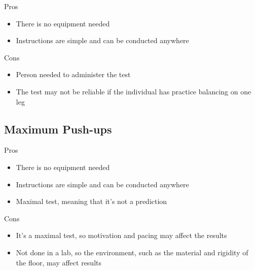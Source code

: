 \documentclass[12pt]{article}
\begin{document}
\begin{minipage}[t]{0.5\textwidth}
    \begin{center}Pros\end{center}
    \begin{itemize}
        \item There is no equipment needed
        \item Instructions are simple and can be conducted anywhere
    \end{itemize}
\end{minipage}
\begin{minipage}[t]{0.5\textwidth}
    \begin{center}Cons\end{center}
    \begin{itemize}
        \item Person needed to administer the test
        \item The test may not be reliable if the individual has practice balancing on one leg
    \end{itemize}
\end{minipage}

\subsection*{Maximum Push-ups}

\begin{minipage}[t]{0.5\textwidth}
    \begin{center}Pros\end{center}
    \begin{itemize}
        \item There is no equipment needed
        \item Instructions are simple and can be conducted anywhere
        \item Maximal test, meaning that it's not a prediction
    \end{itemize}
\end{minipage}
\begin{minipage}[t]{0.5\textwidth}
    \begin{center}Cons\end{center}
    \begin{itemize}
        \item It's a maximal test, so motivation and pacing may affect the results
        \item Not done in a lab, so the environment, such as the material and rigidity of the floor, may affect results
    \end{itemize}
\end{minipage}
\end{document}
